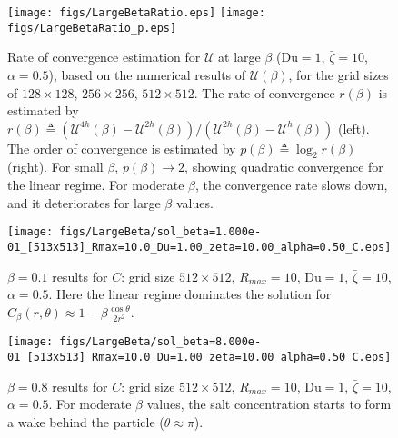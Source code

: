 \documentclass[MSc,beforeExam]{iitcsthesis}
\newcommand\Du{\text{Du}}
\newcommand\cU{\mathscr{U}}
\begin{document}
\begin{figure}
    \begin{center}
    \texttt{[image: figs/LargeBetaRatio.eps]}
    \texttt{[image: figs/LargeBetaRatio\_p.eps]}
        \caption[Rate of convergence estimation for $\cU$ at large $\beta$]
        {Rate of convergence estimation for $\cU$ at large $\beta$  
        ($\Du = 1$, $\bar\zeta = 10$, $\alpha = 0.5$), 
        based on the numerical results of $\cU(\beta)$, for the grid sizes of 
        $128 \times 128$, $256 \times 256$, $512 \times 512$. 
        The rate of convergence $r(\beta)$ is estimated by 
        $r(\beta) \triangleq \left(\cU^{4h}(\beta) - \cU^{2h}(\beta)\right)/\left(\cU^{2h}(\beta) - \cU^{h}(\beta)\right)$ (left). 
        The order of convergence is estimated by $p(\beta) \triangleq \log_2 r(\beta)$ (right).
        For small $\beta$, $p(\beta) \rightarrow 2$, showing 
        quadratic convergence for the linear regime. 
        For moderate $\beta$, the convergence rate slows down, 
        and it deteriorates for large $\beta$ values.
        }
	    \label{fig:LargeBetaRatio}
    \end{center}
\end{figure}

\begin{figure}
    \begin{center}
    \texttt{[image: figs/LargeBeta/sol\_beta=1.000e-01\_[513x513]\_Rmax=10.0\_Du=1.00\_zeta=10.00\_alpha=0.50\_C.eps]}
        \caption[$\beta = 0.1$ results for $C$]
        {$\beta = 0.1$ results for $C$: grid size $512 \times 512$, 
        $R_{max} = 10$, $\Du = 1$, $\bar\zeta = 10$, $\alpha = 0.5$.
        Here the linear regime dominates the solution for 
        $C_\beta(r, \theta) \approx 1 - \beta \frac{\cos\theta}{2r^2}$.}
	    \label{fig:LargeBeta_C1}	    
    \end{center}
\end{figure}

\begin{figure}
    \begin{center}
    \texttt{[image: figs/LargeBeta/sol\_beta=8.000e-01\_[513x513]\_Rmax=10.0\_Du=1.00\_zeta=10.00\_alpha=0.50\_C.eps]}
        \caption[$\beta = 0.8$ results for $C$]
        {$\beta = 0.8$ results for $C$: grid size $512 \times 512$, 
        $R_{max} = 10$, $\Du = 1$, $\bar\zeta = 10$, $\alpha = 0.5$.
        For moderate $\beta$ values, the salt concentration starts
        to form a wake behind the particle ($\theta \approx \pi$).}
	    \label{fig:LargeBeta_C2}	    
    \end{center}
\end{figure}
\end{document}

